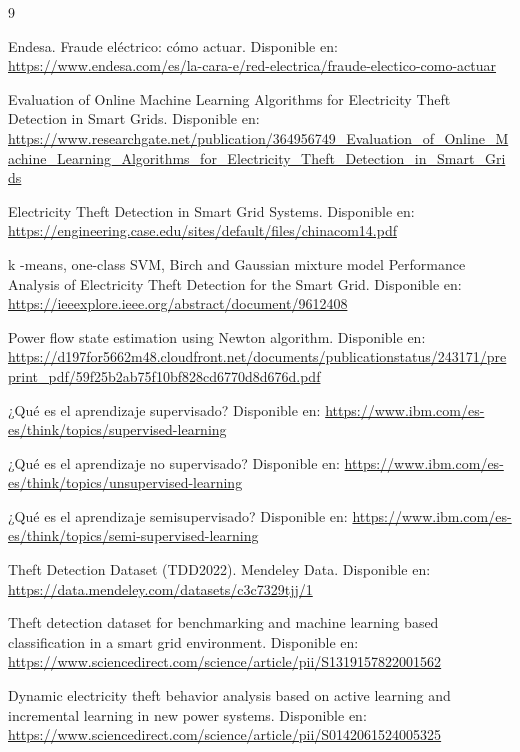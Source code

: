 \documentclass[12pt,a4paper]{report}
\begin{document}
\cleardoublepage
{}
\begin{thebibliography}{9}

Endesa. Fraude eléctrico: cómo actuar. 
Disponible en: \url{https://www.endesa.com/es/la-cara-e/red-electrica/fraude-electico-como-actuar}

Evaluation of Online Machine Learning Algorithms for Electricity Theft Detection in Smart Grids. 
Disponible en: \url{https://www.researchgate.net/publication/364956749_Evaluation_of_Online_Machine_Learning_Algorithms_for_Electricity_Theft_Detection_in_Smart_Grids}

Electricity Theft Detection in Smart Grid Systems. 
Disponible en: \url{https://engineering.case.edu/sites/default/files/chinacom14.pdf}

 k -means, one-class SVM, Birch and Gaussian mixture model
Performance Analysis of Electricity Theft Detection for the Smart Grid.
Disponible en: \url{https://ieeexplore.ieee.org/abstract/document/9612408}

Power flow state estimation using Newton algorithm. 
Disponible en: \url{https://d197for5662m48.cloudfront.net/documents/publicationstatus/243171/preprint_pdf/59f25b2ab75f10bf828cd6770d8d676d.pdf}

¿Qué es el aprendizaje supervisado? 
Disponible en: \url{https://www.ibm.com/es-es/think/topics/supervised-learning}

¿Qué es el aprendizaje no supervisado? 
Disponible en: \url{https://www.ibm.com/es-es/think/topics/unsupervised-learning}

¿Qué es el aprendizaje semisupervisado? 
Disponible en: \url{https://www.ibm.com/es-es/think/topics/semi-supervised-learning}

Theft Detection Dataset (TDD2022). 
Mendeley Data. 
Disponible en: \url{https://data.mendeley.com/datasets/c3c7329tjj/1}

Theft detection dataset for benchmarking and machine learning based classification in a smart grid environment. 
Disponible en: \url{https://www.sciencedirect.com/science/article/pii/S1319157822001562}

Dynamic electricity theft behavior analysis based on active learning and incremental learning in new power systems. 
Disponible en: \url{https://www.sciencedirect.com/science/article/pii/S0142061524005325}


\end{thebibliography}
\end{document}
